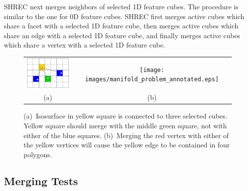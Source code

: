 SHREC next merges neighbors of selected 1D feature cubes.
The procedure is similar to the one for 0D feature cubes.
SHREC first merges active cubes which share a facet with a selected 1D feature cube,
then merges active cubes which share an edge with a selected 1D feature cube,
and finally merges active cubes which share a vertex 
with a selected 1D feature cube.


\begin{figure}[t]
\centering

\begin{tabular}{cc}
\includegraphics[width=1.2in]{images/connectedToIII.eps} \quad &
\quad
\texttt{[image: images/manifold\_problem\_annotated.eps]} \\
(a) & (b)
\end{tabular}

\caption{(a)~Isosurface in yellow square is connected to three selected cubes.
Yellow square should merge with the middle green square,
not with either of the blue squares.
(b)~Merging the red vertex with either of the yellow vertices
will cause the yellow edge to be contained in four polygons.}

\label{fig:connectedToIII}
\label{fig:manifold_problem}
\end{figure}

\subsection{Merging Tests}
\label{section:merging_tests}

